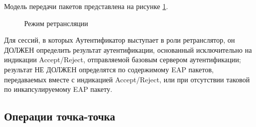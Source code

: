 Модель передачи пакетов представлена на рисунке \ref{img:2}.

\begin{figure}[h]
\caption{Режим ретрансляции}
\label{img:2}
\end{figure}

Для сессий, в которых Аутентификатор выступает в роли ретранслятор, он ДОЛЖЕН определить результат аутентификации, основанный исключительно на индикации Accept/Reject, отправляемой базовым сервером аутентификации; результат НЕ ДОЛЖЕН определятся по содержимому EAP пакетов, передаваемых вместе с индикацией Accept/Reject, или при отсутствии таковой по инкапсулируемому EAP пакету.

\subsection{Операции точка-точка}


